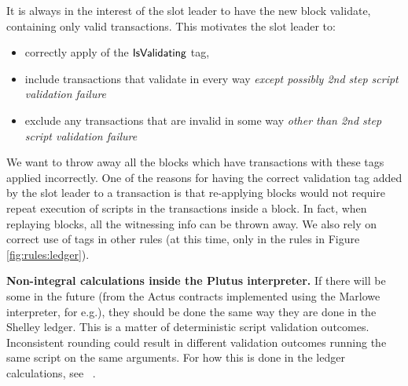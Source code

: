 It is always in the interest of the slot leader to have the new block validate,
containing only valid transactions. This motivates the
slot leader to:

\begin{itemize}
  \item correctly apply of the $\mathsf{IsValidating}$ tag,
  \item include transactions that validate in every way
  \textit{except possibly 2nd step script validation failure}
  \item exclude any transactions that are invalid
in some way \textit{other than 2nd step script validation failure}
\end{itemize}

We want to
throw away all the blocks which have transactions with these tags
applied incorrectly.
One of the reasons for having the correct validation tag added by the slot leader
to a transaction is that re-applying blocks would not require repeat
execution of scripts in the transactions inside a block. In fact, when replaying
blocks, all the witnessing info can be thrown away.
We also rely on correct use of tags in other rules (at this time, only in
the rules in Figure \ref{fig:rules:ledger}).


\textbf{Non-integral calculations inside the Plutus interpreter.} If there
will be some in the future (from the Actus contracts implemented using
the Marlowe interpreter, for e.g.), they should
be done the same way they are done in the Shelley ledger. This is a matter of
deterministic script validation outcomes. Inconsistent rounding could
result in different validation outcomes running the same script on the same
arguments. For how this is done in the ledger calculations, see
~\cite{non_int}.


